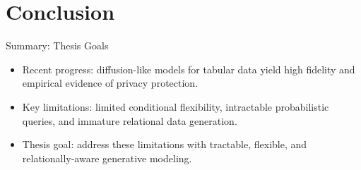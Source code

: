 \section{Conclusion}

\begin{frame}[fragile]{Summary: Thesis Goals}
  \begin{itemize}
    \item Recent progress: diffusion-like models for tabular data yield high fidelity and empirical evidence of privacy protection.
    \item Key limitations: limited conditional flexibility, intractable probabilistic queries, and immature relational data generation.
    \item Thesis goal: address these limitations with tractable, flexible, and relationally-aware generative modeling.
  \end{itemize}
\end{frame}



